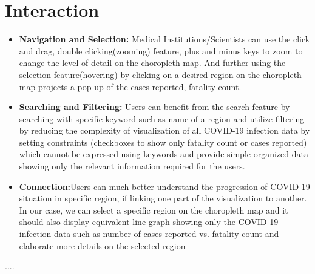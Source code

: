 \documentclass[10pt]{article}
\begin{document}
\section{Interaction}
\begin{itemize}
    \item \textbf{Navigation and Selection:} Medical Institutions/Scientists can use the click and drag, double clicking(zooming) feature, plus and minus keys to zoom to change the level of detail on the choropleth map. And further using the selection feature(hovering) by clicking on a desired region on the choropleth map projects a pop-up of the cases reported, fatality count.   
    \item \textbf{Searching and Filtering:} Users can benefit from the search feature by searching with specific keyword such as name of a region and utilize filtering by reducing the complexity of visualization of all COVID-19 infection data by setting constraints (checkboxes to show only fatality count or cases reported) which cannot be expressed using keywords and provide simple organized data showing only the relevant information required for the users.
    \item \textbf{Connection:}Users can much better understand the progression of COVID-19 situation in specific region, if linking one part of the visualization to another. In our case, we can select a specific region on the choropleth map and it should also display equivalent line graph showing only the COVID-19 infection data such as number of cases reported vs. fatality count and elaborate more details on the selected region
\end{itemize}

....




%
%
\end{document}
